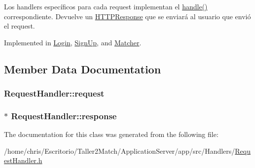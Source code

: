 Los handlers específicos para cada request implementan el \hyperlink{class_request_handler_ada5c3c1669e6c2e4b46923a42b1fdab6}{handle()} correspondiente. Devuelve un \hyperlink{class_h_t_t_p_response}{H\+T\+T\+P\+Response} que se enviará al usuario que envió el request. 



Implemented in \hyperlink{class_login_a911fa05b2b1b8f53cad4286012a7810d}{Login}, \hyperlink{class_sign_up_a3d34e2bcdce1556d4a44bb589ed64ddf}{Sign\+Up}, and \hyperlink{class_matcher_aa88fa5bbb00fe8a0a4b6405f8c22ffa3}{Matcher}.



\subsection{Member Data Documentation}
\hypertarget{class_request_handler_a95913fcd2f05853ba9532b7bacd3a044}{}
\subsubsection[{request}]{ Request\+Handler\+::request\hspace{0.3cm}{\ttfamily [protected]}}\label{class_request_handler_a95913fcd2f05853ba9532b7bacd3a044}
\hypertarget{class_request_handler_aa56594238825cf7e1254001cb8f536ec}{}
\subsubsection[{response}]{$\ast$ Request\+Handler\+::response\hspace{0.3cm}{\ttfamily [protected]}}\label{class_request_handler_aa56594238825cf7e1254001cb8f536ec}


The documentation for this class was generated from the following file\+:\begin{DoxyCompactItemize}
\item 
/home/chris/\+Escritorio/\+Taller2\+Match/\+Application\+Server/app/src/\+Handlers/\hyperlink{_request_handler_8h}{Request\+Handler.\+h}\end{DoxyCompactItemize}
